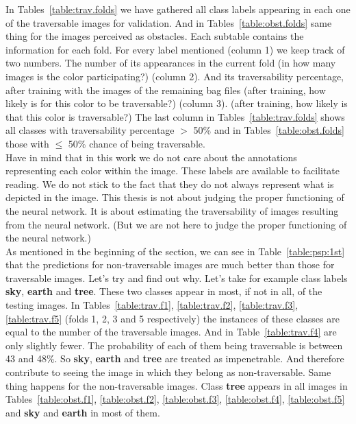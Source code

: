 \documentclass[12pt,a4paper,table,dvipsnames,tikz]{report}
\newcommand{\bl}[1]{{\hypersetup{linkcolor=blue}#1}}
\newcommand{\class}[1]{\textbf{\textcolor{#1}{#1}}} %
\begin{document}
	In Tables~\bl{\ref{table:trav.folds}} we have gathered all class labels appearing in each 
	one of the traversable	images for validation. And in Tables~\bl{\ref{table:obst.folds}} 
	same thing for the images perceived as obstacles. Each subtable contains the information 
	for each fold. For every label mentioned (column 1) we keep track of two numbers. The 
	number of its appearances in the current fold (in how many images is the color participating?) 
	(column 2). And its traversability percentage, after training with the images of the 
	remaining bag files (after training, how likely is for this color to be traversable?) 
	(column 3). (after training, how likely is that this color is traversable?) The last column in Tables~\bl{\ref{table:trav.folds}} shows all classes with traversability percentage $>$ 50\% and in Tables~\bl{\ref{table:obst.folds}} those with $\le$ 50\% chance of being traversable.
	\\
	
	Have in mind that in this work we do not care about the annotations representing each 
	color within the image. These labels are available to facilitate reading. We do not 
	stick to the fact that they do not always represent what is depicted in the image. This 
	thesis is not about judging the proper functioning of the neural network. It is about 
	estimating the traversability of images resulting from the neural network. (But we are not here to judge the proper functioning of the neural network.)
	\\
	
	As mentioned in the beginning of the section, we can see in Table~\bl{\ref{table:psp:1st}} 
	that the predictions for non-traversable images are much better than those for 
	traversable images. Let's try and find out why. Let's take for example class labels 
	\class{sky}, \class{earth} and \class{tree}. These two classes appear in most, if not in 
	all, of the testing images. In Tables~\bl{\ref{table:trav.f1}, \ref{table:trav.f2}, 
	\ref{table:trav.f3}, \ref{table:trav.f5}} (folds 1, 2, 3 and 5 respectively) the instances 
	of these classes are equal to the number of the traversable images. And in 
	Table~\bl{\ref{table:trav.f4}} are only slightly fewer. The probability of each of them 
	being traversable is between 43 and 48\%. So \class{sky}, \class{earth} and \class{tree} 
	are treated as impenetrable. And therefore contribute to seeing the image in which they 
	belong as non-traversable. Same thing happens for the non-traversable images. Class 
	\class{tree} appears in all images in Tables~\bl{\ref{table:obst.f1}, \ref{table:obst.f2}, 
	\ref{table:obst.f3}, \ref{table:obst.f4}, \ref{table:obst.f5}} and \class{sky} and 
	\class{earth} in most of them.
	\\
	
\end{document}
